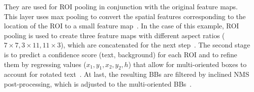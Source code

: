 They are used for \ac{ROI} pooling in conjunction with the original feature maps.
This layer uses max pooling to convert the spatial features corresponding to the location of the
\ac{ROI} to a small feature map~\citep{girshick_fast_2015}.
In the case of this example, \ac{ROI} pooling is used to create three feature maps with different
aspect ratios ($7\times7, 3\times11, 11\times3$), which are concatenated for the next
step~\citep{jiang_r2cnn_2017}.
The second stage is to predict a confidence score (text, background) for each \ac{ROI} and to
refine them by regressing values ($x_1,y_1,x_2,y_2,h$) that allow for multi-oriented boxes to
account for rotated text~\citep{jiang_r2cnn_2017}.
At last, the resulting \acp{BB} are filtered by inclined \ac{NMS} post-processing, which is
adjusted to the multi-oriented \acp{BB}~\citep{jiang_r2cnn_2017}.

